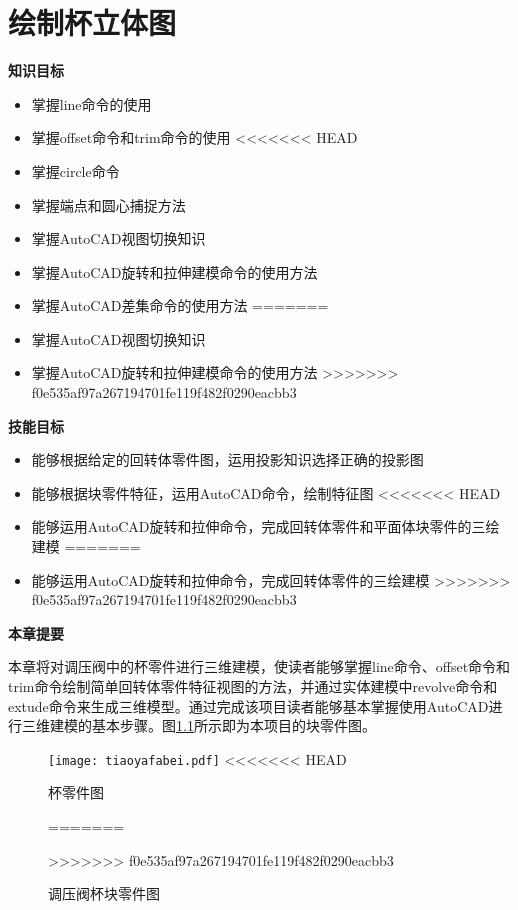 \chapter{绘制杯立体图}
{\bfseries 知识目标}
\begin{itemize}
\item 掌握line命令的使用
\item 掌握offset命令和trim命令的使用
<<<<<<< HEAD
\item 掌握circle命令
\item 掌握端点和圆心捕捉方法
\item 掌握AutoCAD视图切换知识
\item 掌握AutoCAD旋转和拉伸建模命令的使用方法
\item 掌握AutoCAD差集命令的使用方法
=======
\item 掌握AutoCAD视图切换知识
\item 掌握AutoCAD旋转和拉伸建模命令的使用方法
>>>>>>> f0e535af97a267194701fe119f482f0290eacbb3
\end{itemize}

{\bfseries 技能目标}
\begin{itemize}
\item 能够根据给定的回转体零件图，运用投影知识选择正确的投影图
\item 能够根据块零件特征，运用AutoCAD命令，绘制特征图
<<<<<<< HEAD
\item 能够运用AutoCAD旋转和拉伸命令，完成回转体零件和平面体块零件的三绘建模
=======
\item 能够运用AutoCAD旋转和拉伸命令，完成回转体零件的三绘建模
>>>>>>> f0e535af97a267194701fe119f482f0290eacbb3
\end{itemize}

{\bfseries 本章提要}

本章将对调压阀中的杯零件进行三维建模，使读者能够掌握line命令、offset命令和trim命令绘制简单回转体零件特征视图的方法，并通过实体建模中revolve命令和extude命令来生成三维模型。通过完成该项目读者能够基本掌握使用AutoCAD进行三维建模的基本步骤。图\ref{fig:tiaoyafabei}所示即为本项目的块零件图。
\noindent
\begin{figure}[htbp]
\centering
\texttt{[image: tiaoyafabei.pdf]}
<<<<<<< HEAD
\caption{杯零件图}\label{fig:tiaoyafabei}
=======
\caption{调压阀杯块零件图}\label{fig:tiaoyafabei}
>>>>>>> f0e535af97a267194701fe119f482f0290eacbb3
\end{figure}
\endinput